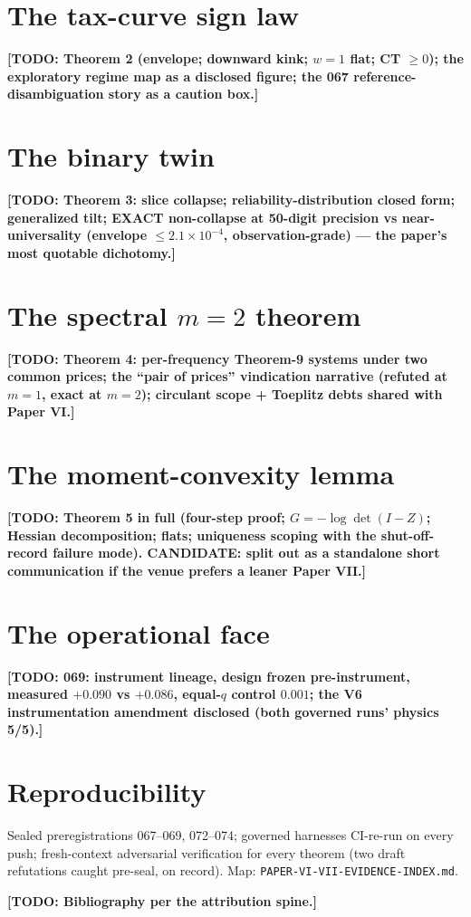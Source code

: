 \documentclass[11pt]{article}
\theoremstyle{remark}
\newcommand{\todo}[1]{\textbf{[TODO: #1]}}
\begin{document}
\section{The tax-curve sign law}
\todo{Theorem 2 (envelope; downward kink; $w{=}1$ flat; CT $\ge0$);
the exploratory regime map as a disclosed figure; the 067
reference-disambiguation story as a caution box.}

\section{The binary twin}
\todo{Theorem 3: slice collapse; reliability-distribution closed
form; generalized tilt; EXACT non-collapse at 50-digit precision vs
near-universality (envelope $\le2.1\times10^{-4}$, observation-grade)
--- the paper's most quotable dichotomy.}

\section{The spectral $m=2$ theorem}
\todo{Theorem 4: per-frequency Theorem-9 systems under two common
prices; the ``pair of prices'' vindication narrative (refuted at
$m=1$, exact at $m=2$); circulant scope + Toeplitz debts shared with
Paper VI.}

\section{The moment-convexity lemma}
\todo{Theorem 5 in full (four-step proof; $G=-\log\det(I-Z)$;
Hessian decomposition; flats; uniqueness scoping with the
shut-off-record failure mode). CANDIDATE: split out as a standalone
short communication if the venue prefers a leaner Paper VII.}

\section{The operational face}
\todo{069: instrument lineage, design frozen pre-instrument,
measured $+0.090$ vs $+0.086$, equal-$q$ control $0.001$; the V6
instrumentation amendment disclosed (both governed runs' physics
5/5).}

\section*{Reproducibility}
Sealed preregistrations 067--069, 072--074; governed harnesses
CI-re-run on every push; fresh-context adversarial verification for
every theorem (two draft refutations caught pre-seal, on record).
Map: \texttt{PAPER-VI-VII-EVIDENCE-INDEX.md}.

\todo{Bibliography per the attribution spine.}
\end{document}
